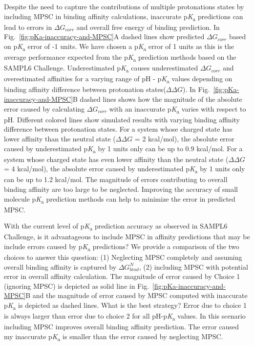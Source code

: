\documentclass[9pt,lineno,final]{elife}
\newcommand{\pKa}{p\textit{K}\textsubscript{a}}
\begin{document}
Despite the need to capture the contributions of multiple protonations states by including MPSC in binding affinity calculations, inaccurate \pKa{} predictions can lead to errors in $\Delta G_{corr}$  and overall free energy of binding prediction. In Fig.~\ref{fig:pKa-inaccuracy-and-MPSC}A dashed lines show predicted $\Delta G_{corr}$ based on \pKa{} error of -1 units. We have chosen a \pKa{} error of 1 units as this is the average performance expected from the \pKa{} prediction methods based on the SAMPL6 Challenge. Underestimated \pKa{} causes underestimated $\Delta G_{corr}$ and overestimated affinities for a varying range of pH - \pKa{} values depending on binding affinity difference between protonation states($\Delta\Delta G$).
In Fig.~\ref{fig:pKa-inaccuracy-and-MPSC}B dashed lines shows how the magnitude of the absolute error caused by calculating $\Delta G_{corr}$ with an inaccurate \pKa{} varies with respect to pH. Different colored lines show simulated results with varying binding affinity difference between protonation states. For a system whose charged state has lower affinity than the neutral state ($\Delta\Delta G$ = 2 kcal/mol), the absolute error caused by underestimated \pKa{} by 1 units only can be up to 0.9 kcal/mol.
For a system whose charged state has even lower affinity than the neutral state ($\Delta\Delta G$ = 4 kcal/mol), the absolute error caused by underestimated \pKa{} by 1 units only can be up to 1.2 kcal/mol.
The magnitude of errors contributing to overall binding affinity are too large to be neglected. Improving the accuracy of small molecule \pKa{} prediction methods can help to minimize the error in predicted MPSC.

With the current level of \pKa{} prediction accuracy as observed in SAMPL6 Challenge, is it advantageous to include MPSC in affinity predictions that may be include errors caused by \pKa{} predictions? We provide a comparison of the two choices to answer this question: (1) Neglecting MPSC completely and assuming overall binding affinity is captured by $\Delta G_{bind}^{N}$, (2) including MPSC with potential error in overall affinity calculation. The magnitude of error caused by Choice 1 (ignoring MPSC) is depicted as solid line in Fig.~\ref{fig:pKa-inaccuracy-and-MPSC}B and the magnitude of error caused by MPSC computed with inaccurate \pKa{}  is depicted as dashed lines. What is the best strategy? Error due to choice 1 is always larger than error due to choice 2 for all pH-\pKa{} values. In this scenario including MPSC improves overall binding affinity prediction. The error caused my inaccurate \pKa{} is smaller than the error caused by neglecting MPSC. 
\end{document}

